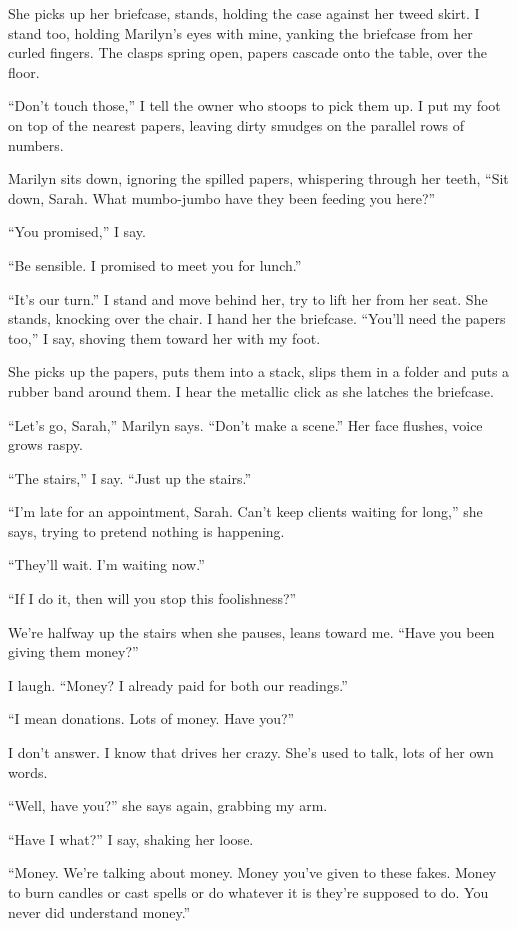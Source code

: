 \documentclass[
]{article}
\begin{document}
She picks up her briefcase, stands, holding the case against her tweed
skirt. I stand too, holding Marilyn's eyes with mine, yanking the
briefcase from her curled fingers. The clasps spring open, papers
cascade onto the table, over the floor.

``Don't touch those,'' I tell the owner who stoops to pick them up. I
put my foot on top of the nearest papers, leaving dirty smudges on the
parallel rows of numbers.

Marilyn sits down, ignoring the spilled papers, whispering through her
teeth, ``Sit down, Sarah. What mumbo-jumbo have they been feeding you
here?''

``You promised,'' I say.

``Be sensible. I promised to meet you for lunch.''

``It's our turn.'' I stand and move behind her, try to lift her from her
seat. She stands, knocking over the chair. I hand her the briefcase.
``You'll need the papers too,'' I say, shoving them toward her with my
foot.

She picks up the papers, puts them into a stack, slips them in a folder
and puts a rubber band around them. I hear the metallic click as she
latches the briefcase.

``Let's go, Sarah,'' Marilyn says. ``Don't make a scene.'' Her face
flushes, voice grows raspy.

``The stairs,'' I say. ``Just up the stairs.''

``I'm late for an appointment, Sarah. Can't keep clients waiting for
long,'' she says, trying to pretend nothing is happening.

``They'll wait. I'm waiting now.''

``If I do it, then will you stop this foolishness?''

We're halfway up the stairs when she pauses, leans toward me. ``Have you
been giving them money?''

I laugh. ``Money? I already paid for both our readings.''

``I mean donations. Lots of money. Have you?''

I don't answer. I know that drives her crazy. She's used to talk, lots
of her own words.

``Well, have you?'' she says again, grabbing my arm.

``Have I what?'' I say, shaking her loose.

``Money. We're talking about money. Money you've given to these fakes.
Money to burn candles or cast spells or do whatever it is they're
supposed to do. You never did understand money.''
\end{document}
